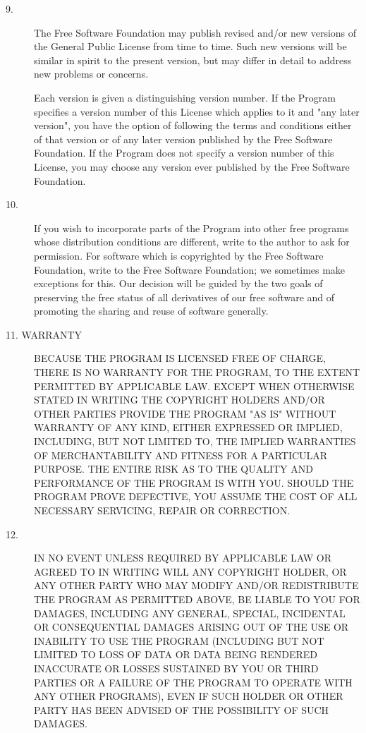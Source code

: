 \begin{description}
\item[9.] The  Free  Software Foundation   may  publish revised  and/or new
versions of the General Public License from time to time.  Such new
versions will be similar in spirit to the present version, but may
differ in detail to address new problems or concerns.

Each version is given a distinguishing version number.  If the Program
specifies a version number of this License which applies to it and
"any later version", you have the option of following the terms and
conditions either of that version or of any later version published by
the Free Software Foundation.  If the Program does not specify a
version number of this License, you may choose any version ever
published by the Free Software Foundation.

\item[10.] If you wish to incorporate parts of  the Program into other free
programs whose distribution conditions are different, write to the
author to ask for permission.  For software which is copyrighted by
the Free Software Foundation, write to the Free Software Foundation;
we sometimes make exceptions for this.  Our decision will be guided by
the two goals of preserving the free status of all derivatives of our
free software and of promoting the sharing and reuse of software
generally.

\item[11. WARRANTY] BECAUSE THE  PROGRAM  IS LICENSED  FREE OF CHARGE,   
THERE IS NO WARRANTY FOR THE PROGRAM, TO THE EXTENT PERMITTED BY
APPLICABLE LAW.  EXCEPT WHEN OTHERWISE STATED IN WRITING THE COPYRIGHT
HOLDERS AND/OR OTHER PARTIES PROVIDE THE PROGRAM "AS IS" WITHOUT
WARRANTY OF ANY KIND, EITHER EXPRESSED OR IMPLIED, INCLUDING, BUT NOT
LIMITED TO, THE IMPLIED WARRANTIES OF MERCHANTABILITY AND FITNESS FOR
A PARTICULAR PURPOSE.  THE ENTIRE RISK AS TO THE QUALITY AND
PERFORMANCE OF THE PROGRAM IS WITH YOU.  SHOULD THE PROGRAM PROVE
DEFECTIVE, YOU ASSUME THE COST OF ALL NECESSARY SERVICING, REPAIR OR
CORRECTION.

\item[12.] IN NO EVENT UNLESS  REQUIRED BY APPLICABLE  LAW OR AGREED  TO IN
WRITING WILL ANY COPYRIGHT HOLDER, OR ANY OTHER PARTY WHO MAY MODIFY
AND/OR REDISTRIBUTE THE PROGRAM AS PERMITTED ABOVE, BE LIABLE TO YOU
FOR DAMAGES, INCLUDING ANY GENERAL, SPECIAL, INCIDENTAL OR
CONSEQUENTIAL DAMAGES ARISING OUT OF THE USE OR INABILITY TO USE THE
PROGRAM (INCLUDING BUT NOT LIMITED TO LOSS OF DATA OR DATA BEING
RENDERED INACCURATE OR LOSSES SUSTAINED BY YOU OR THIRD PARTIES OR A
FAILURE OF THE PROGRAM TO OPERATE WITH ANY OTHER PROGRAMS), EVEN IF
SUCH HOLDER OR OTHER PARTY HAS BEEN ADVISED OF THE POSSIBILITY OF SUCH
DAMAGES.
\end{description}

